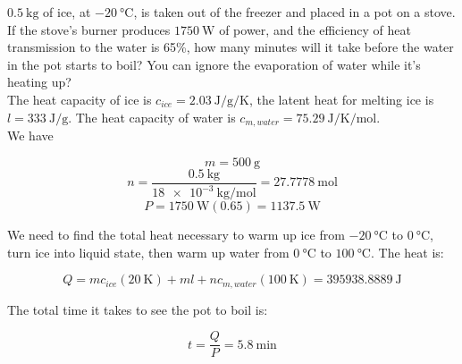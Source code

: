 \documentclass[12pt, a4paper]{article}
\newcounter{exa}
\begin{document}
\begin{texample}
$\SI{0.5}{\kilo\gram}$ of ice, at $\SI{-20}{\celsius}$, is taken out of the freezer and placed in a pot on a stove. If the stove's burner produces $\SI{1750}{\watt}$ of power, and the efficiency of heat transmission to the water is 65\%, how many minutes will it take before the water in the pot starts to boil? You can ignore the evaporation of water while it's heating up? \\

The heat capacity of ice is $c_{ice}=\SI{2.03}{\joule\per\gram\per\kelvin}$, the latent heat for melting ice is $l=\SI{333}{\joule\per\gram}$. The heat capacity of water is $c_{m,water}=\SI{75.29}{\joule\per\kelvin\per\mole}$. \\

We have

\[m=\SI{500}{\gram}\]
\[n=\frac{\SI{0.5}{\kilo\gram}}{\SI{18e-3}{\kilo\gram\per\mole}}=\SI{27.7778}{\mole}\]
\[P=\SI{1750}{\watt} (0.65)=\SI{1137.5}{\watt}\]

We need to find the total heat necessary to warm up ice from $\SI{-20}{\celsius}$ to $\SI{0}{\celsius}$, turn ice into liquid state, then warm up water from $\SI{0}{\celsius}$ to $\SI{100}{\celsius}$. The heat is:

\[Q=mc_{ice}(\SI{20}{\kelvin})+ml+nc_{m,water}(\SI{100}{\kelvin})=\SI{395938.8889}{\joule}\]

The total time it takes to see the pot to boil is:

\[t=\frac{Q}{P}=\SI{5.8}{\minute}\]
\end{texample}
\end{document}
